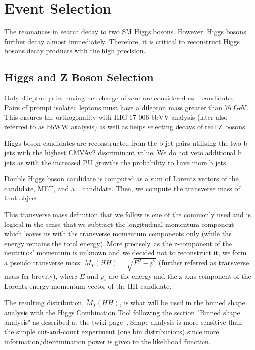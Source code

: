 \chapter{Event Selection}
\label{ch:selection}

The resonances in search decay to two SM Higgs bosons. However, Higgs bosons further decay almost immediately. Therefore, it is critical to reconstruct Higgs bosons decay products with the high precision. 

\section{Higgs and Z Boson Selection}



Only dilepton pairs having net charge of zero are considered as \ZtoLL~ candidates. 
Pairs of prompt isolated leptons must have a dilepton mass greater than 76 GeV. This ensures the orthogonality with HIG-17-006 bbVV analysis (later also referred to as bbWW analysis) as well as helps selecting decays of real Z bosons.

Higgs boson candidates are reconstructed from the b jet pairs utilising the two b jets with the highest CMVAv2 discriminant value. We do not veto additional b jets as with the increased PU growths the probability to have more b jets. 

Double Higgs boson candidate is computed as a sum of Lorentz vectors of the \ZtoLL~ candidate, MET, and a \HBB~ candidate. Then, we compute the transverse mass of that object. 

This transverse mass definition that we follow is one of the commonly used and is logical in the sense that we subtract the longitudinal momentum component which leaves us with the transverse momentum components only (while the energy remains the total energy). More precisely, as the z-component of the neutrinos' momentum is unknown and we decided not to reconstruct it, we form a pseudo transverse mass: $\tilde{M}_T(HH) = \sqrt{E^2 - p_{z}^2}$ (further referred as transverse mass for brevity), where $E$ and $p_z$ are the energy and the z-axis component of the Lorentz energy-momentum vector of the HH candidate.

The resulting distribution, $\tilde{M}_T(HH)$, is what will be used in the binned shape analysis with the Higgs Combination Tool following the section "Binned shape analysis" as described at the twiki page~\cite{CombinedLimit}. Shape analysis is more sensitive than the simple cut-and-count experiment (one bin distributions) since more information/discrimination power is given to the likelihood function. 

